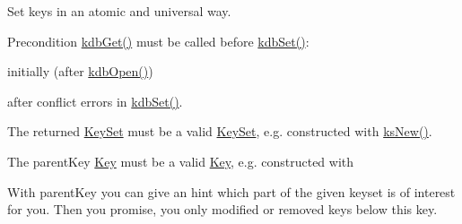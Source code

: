 Set keys in an atomic and universal way.  \begin{DoxyPrecond}{Precondition}
\hyperlink{group__kdb_ga28e385fd9cb7ccfe0b2f1ed2f62453a1}{kdb\-Get()} must be called before \hyperlink{group__kdb_ga11436b058408f83d303ca5e996832bcf}{kdb\-Set()}\-:
\begin{DoxyItemize}
\item initially (after \hyperlink{group__kdb_ga6808defe5870f328dd17910aacbdc6ca}{kdb\-Open()})
\item after conflict errors in \hyperlink{group__kdb_ga11436b058408f83d303ca5e996832bcf}{kdb\-Set()}.
\end{DoxyItemize}

The {\ttfamily returned} \hyperlink{classkdb_1_1KeySet}{Key\-Set} must be a valid \hyperlink{classkdb_1_1KeySet}{Key\-Set}, e.\-g. constructed with \hyperlink{group__keyset_ga671e1aaee3ae9dc13b4834a4ddbd2c3c}{ks\-New()}.

The {\ttfamily parent\-Key} \hyperlink{classkdb_1_1Key}{Key} must be a valid \hyperlink{classkdb_1_1Key}{Key}, e.\-g. constructed with
\end{DoxyPrecond}
With {\ttfamily parent\-Key} you can give an hint which part of the given keyset is of interest for you. Then you promise, you only modified or removed keys below this key.


